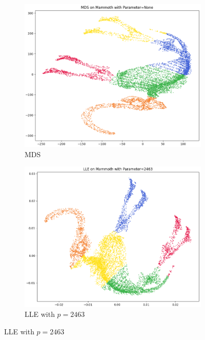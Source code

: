 \begin{figure}[!]
     \centering
     \begin{subfigure}[t]{0.51\columnwidth}
    	\centering
    	\includegraphics[width=\columnwidth]{images/KMEANS_5_MDS.png}
    	\caption{MDS}
        \label{fig:KMEANS_5_MDS}
    \end{subfigure}
     \hfill
     \begin{subfigure}[t]{0.49\columnwidth}
    	\centering
    	\includegraphics[width=\columnwidth]{images/KMEANS_5_LLE_2463.png}
    	\caption{LLE with $p=2463$}
        \label{fig:KMEANS_5_LLE_2463}
    \end{subfigure}

\end{figure}
